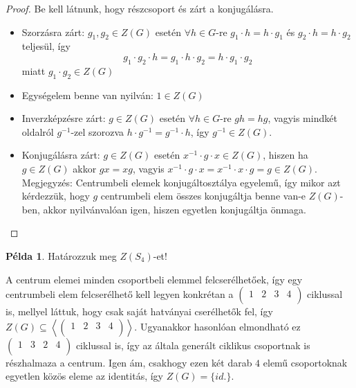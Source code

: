 \documentclass[12pt]{book}
\theoremstyle{plain} %
\theoremstyle{definition} %
\newtheorem{pl}{Példa}[section]
\theoremstyle{remark}
\numberwithin{equation}{section}  %
\begin{document}
	\begin{proof}
		Be kell látnunk, hogy részcsoport és zárt a konjugálásra.
		
		\begin{itemize}
			\item Szorzásra zárt: $g_1, g_2 \in Z(G)$ esetén $\forall h\in G$-re $g_1\cdot h = h \cdot g_1$ és $g_2 \cdot h = h \cdot g_2$ teljesül, így
			\[ g_1 \cdot g_2 \cdot h = g_1 \cdot h \cdot g_2 = h \cdot g_1 \cdot g_2  \]
			miatt $g_1\cdot g_2 \in Z(G)$
			\item Egységelem benne van nyilván: $1\in Z(G)$
			\item Inverzképzésre zárt: $g\in Z(G)$ esetén $\forall h\in G$-re $gh=hg$, vagyis mindkét oldalról $g^{-1}$-zel szorozva $h\cdot g^{-1} = g^{-1} \cdot h$, így $g^{-1} \in Z(G)$.
			\item Konjugálásra zárt: $g\in Z(G)$ esetén $x^{-1} \cdot g \cdot x \in Z(G)$, hiszen ha $g\in Z(G)$ akkor $gx=xg$, vagyis $x^{-1}\cdot g \cdot x = x^{-1} \cdot x \cdot g = g \in Z(G)$.
			Megjegyzés: Centrumbeli elemek konjugáltosztálya egyelemű, így mikor azt kérdezzük, hogy $g$ centrumbeli elem összes konjugáltja benne van-e $Z(G)$-ben, akkor nyilvánvalóan igen, hiszen egyetlen konjugáltja önmaga.
		\end{itemize}
	\end{proof}
	
	\begin{pl}
		Határozzuk meg $Z(S_4)$-et!
		
		A centrum elemei minden csoportbeli elemmel felcserélhetőek, így egy centrumbeli elem felcserélhető kell legyen konkrétan a $\begin{pmatrix}
		1 & 2 & 3 & 4 \\
		\end{pmatrix}$ ciklussal is, mellyel láttuk, hogy csak saját hatványai cserélhetők fel, így $Z(G) \subseteq \left \langle \begin{pmatrix}
		1 & 2 & 3 & 4 \\
		\end{pmatrix} \right \rangle$. Ugyanakkor hasonlóan elmondható ez $\begin{pmatrix}
		1 & 3 & 2 & 4 \\
		\end{pmatrix}$ ciklussal is, így az általa generált ciklikus csoportnak is részhalmaza a centrum. Igen ám, csakhogy ezen két darab $4$ elemű csoportoknak egyetlen közös eleme az identitás, így $Z(G) = \{id.\}$.
	\end{pl}
\end{document}
